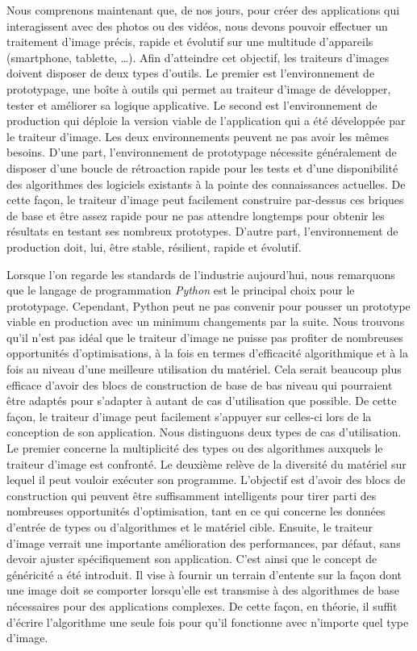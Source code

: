 Nous comprenons maintenant que, de nos jours, pour créer des applications qui interagissent avec des photos ou des
vidéos, nous devons pouvoir effectuer un traitement d'image précis, rapide et évolutif sur une multitude d'appareils
(smartphone, tablette, \ldots). Afin d'atteindre cet objectif, les traiteurs d'images doivent disposer de deux types
d'outils. Le premier est l'environnement de prototypage, une boîte à outils qui permet au traiteur d'image de
développer, tester et améliorer sa logique applicative. Le second est l'environnement de production qui déploie la
version viable de l'application qui a été développée par le traiteur d'image. Les deux environnements peuvent ne pas
avoir les mêmes besoins. D'une part, l'environnement de prototypage nécessite généralement de disposer d'une boucle de
rétroaction rapide pour les tests et d'une disponibilité des algorithmes des logiciels existants à la pointe des
connaissances actuelles. De cette façon, le traiteur d'image peut facilement construire par-dessus ces briques de base
et être assez rapide pour ne pas attendre longtemps pour obtenir les résultats en testant ses nombreux prototypes.
D'autre part, l'environnement de production doit, lui, être stable, résilient, rapide et évolutif.

Lorsque l'on regarde les standards de l'industrie aujourd'hui, nous remarquons que le langage de programmation
\emph{Python} est le principal choix pour le prototypage. Cependant, Python peut ne pas convenir pour pousser un
prototype viable en production avec un minimum changements par la suite. Nous trouvons qu'il n'est pas idéal que le
traiteur d'image ne puisse pas profiter de nombreuses opportunités d'optimisations, à la fois en termes d'efficacité
algorithmique et à la fois au niveau d'une meilleure utilisation du matériel. Cela serait beaucoup plus efficace d'avoir
des blocs de construction de base de bas niveau qui pourraient être adaptés pour s'adapter à autant de cas d'utilisation
que possible. De cette façon, le traiteur d'image peut facilement s'appuyer sur celles-ci lors de la conception de son
application. Nous distinguons deux types de cas d'utilisation. Le premier concerne la multiplicité des types ou des
algorithmes auxquels le traiteur d'image est confronté. Le deuxième relève de la diversité du matériel sur lequel il
peut vouloir exécuter son programme. L'objectif est d'avoir des blocs de construction qui peuvent être suffisamment
intelligents pour tirer parti des nombreuses opportunités d'optimisation, tant en ce qui concerne les données d'entrée
de types ou d'algorithmes et le matériel cible. Ensuite, le traiteur d'image verrait une importante amélioration des
performances, par défaut, sans devoir ajuster spécifiquement son application. C'est ainsi que le concept de généricité a
été introduit. Il vise à fournir un terrain d'entente sur la façon dont une image doit se comporter lorsqu'elle est
transmise à des algorithmes de base nécessaires pour des applications complexes. De cette façon, en théorie, il suffit
d'écrire l'algorithme une seule fois pour qu'il fonctionne avec n'importe quel type d'image.

